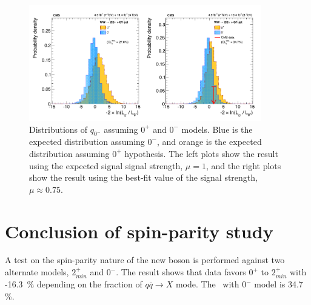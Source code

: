 %
\begin{figure}[ht!] 
\centering 
\includegraphics[width=0.9\textwidth]{figures/spin0mLLR.pdf}
\caption{Distributions of $q_{0^-}$ assuming $0^+$ and $0^-$ models.  
Blue is the expected distribution assuming $0^-$, 
and orange is the expected distribution assuming $0^+$ hypothesis.
The left plots show the result using the expected signal signal strength, $\mu=1$, 
and the right plots show the result using the best-fit value of the signal strength, 
$\mu \approx 0.75$.}  
\label{fig:llr_spin0m} 
\end{figure} 

\section{Conclusion of spin-parity study} 

A test on the spin-parity nature of the new boson is performed against two alternate 
models, $2_{min}^+$ and $0^-$. The result shows that data favors $0^+$ to 
$2_{min}^+$ with -16.3~\% depending on the fraction of 
$q\bar{q}\rightarrow X$ mode. The \CLs\ with $0^-$ model is 34.7 \%.  


